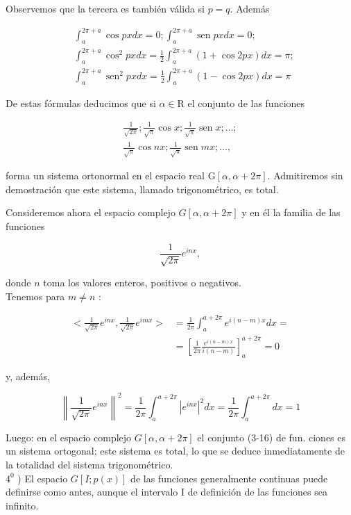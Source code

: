 \documentclass[10pt]{article}
\theoremstyle{plain}
\theoremstyle{definition}
\theoremstyle{remark}
\begin{document}
Observemos que la tercera es también válida si $p=q$. Además

$$
\begin{aligned}
& \int_{a}^{2 \pi+a} \cos p x d x=0 ; \int_{a}^{2 \pi+a} \operatorname{sen} p x d x=0 ; \\
& \int_{a}^{2 \pi+a} \cos ^{2} p x d x=\frac{1}{2} \int_{a}^{2 \pi+a}(1+\cos 2 p x) d x=\pi ; \\
& \int_{a}^{2 \pi+a} \operatorname{sen}^{2} p x d x=\frac{1}{2} \int_{a}^{2 \pi+a}(1-\cos 2 p x) d x=\pi
\end{aligned}
$$

De estas fórmulas deducimos que si $\alpha \in \mathrm{R}$ el conjunto de las funciones

\[
\begin{array}{r}
\frac{1}{\sqrt{2 \pi}} ; \frac{1}{\sqrt{\pi}} \cos x ; \frac{1}{\sqrt{\pi}} \operatorname{sen} x ; \ldots ; \\
\frac{1}{\sqrt{\pi}} \cos n x ; \frac{1}{\sqrt{\pi}} \operatorname{sen} m x ; \ldots, \tag{3-15}
\end{array}
\]

forma un sistema ortonormal en el espacio real $\mathrm{G}[\alpha, \alpha+2 \pi]$. Admitiremos sin demostración que este sistema, llamado trigonométrico, es total.

Consideremos ahora el espacio complejo $G[\alpha, \alpha+2 \pi]$ y en él la familia de las funciones

$$
\frac{1}{\sqrt{2 \pi}} e^{i n x},
$$

donde $n$ toma los valores enteros, positivos o negativos.\\
Tenemos para $m \neq n$ :

$$
\begin{aligned}
<\frac{1}{\sqrt{2 \pi}} e^{i n x}, \frac{1}{\sqrt{2 \pi}} e^{i m x}> & =\frac{1}{2 \pi} \int_{a}^{a+2 \pi} e^{i(n-m) x} d x= \\
& =\left[\frac{1}{2 \pi} \frac{e^{i(n-m) x}}{i(n-m)}\right]_{a}^{a+2 \pi}=0
\end{aligned}
$$


y, además,

$$
\left\|\frac{1}{\sqrt{2 \pi}} e^{i n x}\right\|^{2}=\frac{1}{2 \pi} \int_{a}^{a+2 \pi}\left|e^{i n x}\right|^{2} d x=\frac{1}{2 \pi} \int_{a}^{a+2 \pi} d x=1
$$

Luego: en el espacio complejo $G[\alpha, \alpha+2 \pi]$ el conjunto (3-16) de fun. ciones es un sistema ortogonal; este sistema es total, lo que se deduce inmediatamente de la totalidad del sistema trigonométrico.\\
$4^{0}$ ) El espacio $G[I ; p(x)]$ de las funciones generalmente continuas puede definirse como antes, aunque el intervalo I de definición de las funciones sea infinito.
\end{document}
